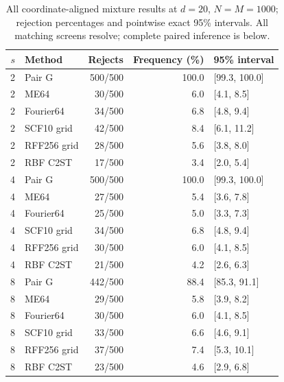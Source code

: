 \begin{table}[t]\centering\scriptsize
\caption{All coordinate-aligned mixture results at $d=20$, $N=M=1000$; rejection percentages and pointwise exact 95\% intervals. All matching screens resolve; complete paired inference is below.}
\label{tab:axis-power-d20}
{\setlength{\tabcolsep}{8pt}\renewcommand{\arraystretch}{1.2}
\begin{tabular}{rlrrl}
\toprule
$s$ & Method & Rejects & Frequency (\%) & 95\% interval\\
\midrule
2 & Pair G & 500/500 & 100.0 & [99.3, 100.0]\\
2 & ME64 & 30/500 & 6.0 & [4.1, 8.5]\\
2 & Fourier64 & 34/500 & 6.8 & [4.8, 9.4]\\
2 & SCF10 grid & 42/500 & 8.4 & [6.1, 11.2]\\
2 & RFF256 grid & 28/500 & 5.6 & [3.8, 8.0]\\
2 & RBF C2ST & 17/500 & 3.4 & [2.0, 5.4]\\
4 & Pair G & 500/500 & 100.0 & [99.3, 100.0]\\
4 & ME64 & 27/500 & 5.4 & [3.6, 7.8]\\
4 & Fourier64 & 25/500 & 5.0 & [3.3, 7.3]\\
4 & SCF10 grid & 34/500 & 6.8 & [4.8, 9.4]\\
4 & RFF256 grid & 30/500 & 6.0 & [4.1, 8.5]\\
4 & RBF C2ST & 21/500 & 4.2 & [2.6, 6.3]\\
8 & Pair G & 442/500 & 88.4 & [85.3, 91.1]\\
8 & ME64 & 29/500 & 5.8 & [3.9, 8.2]\\
8 & Fourier64 & 30/500 & 6.0 & [4.1, 8.5]\\
8 & SCF10 grid & 33/500 & 6.6 & [4.6, 9.1]\\
8 & RFF256 grid & 37/500 & 7.4 & [5.3, 10.1]\\
8 & RBF C2ST & 23/500 & 4.6 & [2.9, 6.8]\\
\bottomrule
\end{tabular}}
\end{table}

